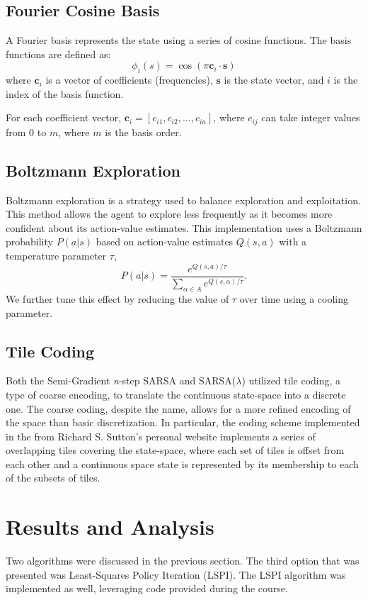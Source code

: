 \documentclass[journal]{IEEEtran}
\begin{document}
\subsection{Fourier Cosine Basis}
A Fourier basis represents the state using a series of cosine functions. 
The basis functions are defined as:
\[ \phi_i(s)=\cos(\pi\mathbf{c}_i\cdot\mathbf{s}) \]
where \(\mathbf{c}_i\) is a vector of coefficients (frequencies), 
\(\mathbf{s}\) is the state vector, and \(i\) is the index of the basis function.

For each coefficient vector, \(\mathbf{c}_i = [c_{i1},c_{i2},\ldots,c_{in}]\), where 
\(c_{ij}\) can take integer values from \(0\) to \(m\), where \(m\) is the basis order.

\subsection{Boltzmann Exploration}
Boltzmann exploration is a strategy used to balance exploration and exploitation. 
This method allows the agent to explore less frequently as it becomes more confident about its 
action-value estimates. This implementation uses a Boltzmann probability \(P(a|s)\) based
on action-value estimates \(Q(s,a)\) with a temperature parameter \(\tau\),
\[ P(a|s) = \frac{e^{Q(s,a)/\tau}}{\sum_{\alpha\in A} e^{Q(s,\alpha)/\tau}} .\]
We further tune this effect by reducing the value of \(\tau\) over time using a cooling parameter.

\subsection{Tile Coding}
Both the Semi-Gradient \emph{n}-step SARSA and SARSA($\lambda$) utilized tile coding,
a type of coarse encoding, to translate the continuous state-space into a discrete one.
The coarse coding, despite the name, allows for a more refined encoding of the space
than basic discretization. In particular, the coding scheme implemented in the
 from Richard S. Sutton's personal website
implements a series of overlapping tiles covering the state-space, where each set of tiles
is offset from each other and a continuous space state is represented by its membership to each
of the subsets of tiles.

\section{Results and Analysis}
\label{sec:results}
Two algorithms were discussed in the previous section. 
The third option that was presented was Least-Squares Policy Iteration (LSPI).
The LSPI algorithm was implemented as well, leveraging code provided during the course.
\end{document}
